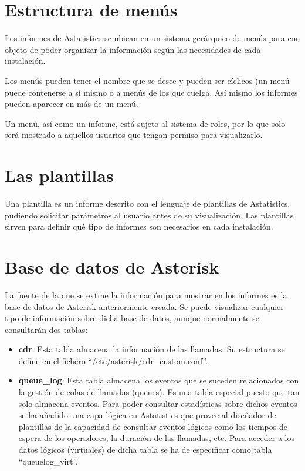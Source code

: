 \documentclass[spanish,12pt]{book}
\begin{document}
\section{Estructura de menús}
Los informes de Astatistics se ubican en un sistema gerárquico de menús para con objeto de poder organizar la información según las necesidades de cada instalación.

Los menús pueden tener el nombre que se desee y pueden ser cíclicos (un menú puede contenerse a sí mismo o a menús de los que cuelga. Así mismo los informes pueden aparecer en más de un menú.

Un menú, así como un informe, está sujeto al sistema de roles, por lo que solo será mostrado a aquellos usuarios que tengan permiso para visualizarlo.

\section{Las plantillas}
Una plantilla es un informe descrito con el lenguaje de plantillas de Astatistics, pudiendo solicitar parámetros al usuario antes de su visualización. Las plantillas sirven para definir qué tipo de informes son necesarios en cada instalación.

\section{Base de datos de Asterisk}
La fuente de la que se extrae la información para mostrar en los informes es la base de datos de Asterisk anteriormente creada. Se puede visualizar cualquier tipo de información sobre dicha base de datos, aunque normalmente se consultarán dos tablas:

\begin{itemize}
\item {\bf cdr}: Esta tabla almacena la información de las llamadas. Su estructura se define en el fichero ``/etc/asterisk/cdr\_custom.conf''.
\item {\bf queue\_log}: Esta tabla almacena los eventos que se suceden relacionados con la gestión de colas de llamadas (queues). Es una tabla especial puesto que tan solo almacena eventos. Para poder consultar estadísticas sobre dichos eventos se ha añadido una capa lógica en Astatistics que provee al diseñador de plantillas de la capacidad de consultar eventos lógicos como los tiempos de espera de los operadores, la duración de las llamadas, etc. Para acceder a los datos lógicos (virtuales) de dicha tabla se ha de especificar como tabla ``queuelog\_virt''.\end{itemize}
\end{document}
